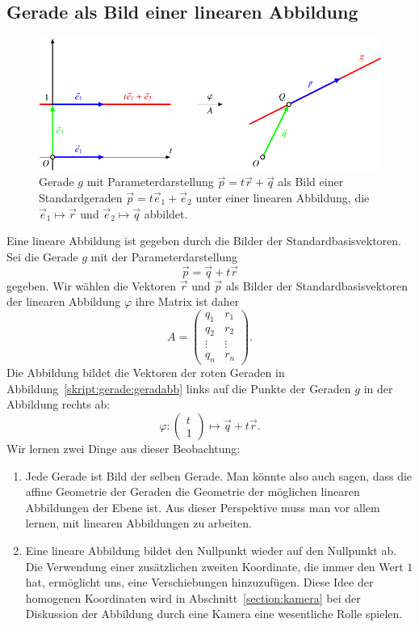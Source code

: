 \subsection{Gerade als Bild einer linearen Abbildung}
\begin{figure}
\centering
\includegraphics{3/images/geradeabb.pdf}
\caption{Gerade $g$ mit Parameterdarstellung $\vec{p} = t\vec{r}+\vec{q}$
als Bild einer Standardgeraden $\vec{p}=t\vec{e}_1+\vec{e}_2$ unter
einer linearen Abbildung, die $\vec{e}_1\mapsto\vec{r}$
und $\vec{e}_2\mapsto\vec{q}$ abbildet.
\label{skript:gerade:geradabb}}
\end{figure}
Eine lineare Abbildung ist gegeben durch die Bilder der
Standardbasisvektoren.
Sei die Gerade $g$ mit der Parameterdarstellung
\[
\vec{p}
=
\vec{q} + t\vec{r}
\]
gegeben.
Wir wählen die Vektoren $\vec{r}$ und $\vec{p}$ als Bilder der
Standardbasisvektoren der linearen Abbildung $\varphi$ ihre Matrix ist
daher 
\[
A=
\begin{pmatrix}
q_1   &r_1   \\
q_2   &r_2   \\
\vdots&\vdots\\
q_n   &r_n   
\end{pmatrix}.
\]
Die Abbildung bildet die Vektoren der roten Geraden in
Abbildung~\eqref{skript:gerade:geradabb} links auf die Punkte der
Geraden $g$ in der Abbildung rechts ab:
\[
\varphi
:
\begin{pmatrix}
t\\1
\end{pmatrix}
\mapsto
\vec{q}+t\vec{r}.
\]
Wir lernen zwei Dinge aus dieser Beobachtung:
\begin{enumerate}
\item
Jede Gerade ist Bild der selben Gerade.
Man könnte also auch sagen, dass die affine Geometrie der Geraden
die Geometrie der möglichen linearen Abbildungen der Ebene ist.
Aus dieser Perspektive muss man vor allem lernen, mit linearen
Abbildungen zu arbeiten.
\item
Eine lineare Abbildung bildet den Nullpunkt wieder auf den Nullpunkt ab.
Die Verwendung einer zusätzlichen zweiten Koordinate, die immer den
Wert $1$ hat, ermöglicht uns, eine Verschiebungen hinzuzufügen.
Diese Idee der homogenen Koordinaten wird in Abschnitt~\ref{section:kamera}
bei der Diskussion der Abbildung durch eine Kamera eine wesentliche Rolle
spielen.
\end{enumerate}



